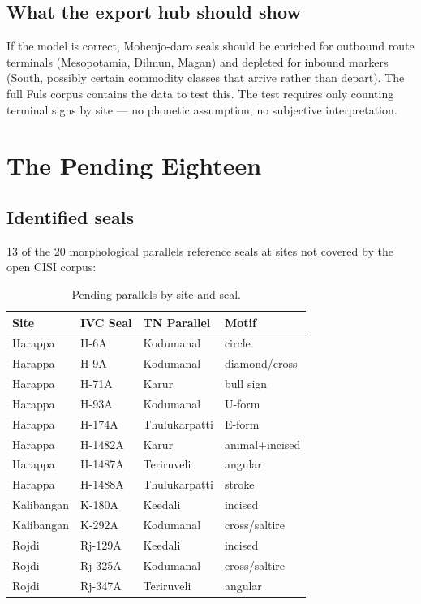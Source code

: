 \subsection{What the export hub should show}

If the model is correct, Mohenjo-daro seals should be enriched
for outbound route terminals (Mesopotamia, Dilmun, Magan) and
depleted for inbound markers (South, possibly certain commodity
classes that arrive rather than depart). The full Fuls corpus
contains the data to test this. The test requires only counting
terminal signs by site --- no phonetic assumption, no subjective
interpretation.

\section{The Pending Eighteen}

\subsection{Identified seals}

13 of the 20 morphological parallels reference seals at sites
not covered by the open CISI corpus:

\begin{longtable}{@{}llll@{}}
\caption{Pending parallels by site and seal.}
\label{tab:pending}\\
\toprule
Site & IVC Seal & TN Parallel & Motif \\
\midrule
\endfirsthead
\bottomrule
\endlastfoot
Harappa & H-6A   & Kodumanal & circle \\
\midrule
Harappa & H-9A   & Kodumanal & diamond/cross \\
\midrule
Harappa & H-71A  & Karur & bull sign \\
\midrule
Harappa & H-93A  & Kodumanal & U-form \\
\midrule
Harappa & H-174A & Thulukarpatti & E-form \\
\midrule
Harappa & H-1482A & Karur & animal+incised \\
\midrule
Harappa & H-1487A & Teriruveli & angular \\
\midrule
Harappa & H-1488A & Thulukarpatti & stroke \\
\midrule
Kalibangan & K-180A & Keedali & incised \\
\midrule
Kalibangan & K-292A & Kodumanal & cross/saltire \\
\midrule
Rojdi & Rj-129A & Keedali & incised \\
\midrule
Rojdi & Rj-325A & Kodumanal & cross/saltire \\
\midrule
Rojdi & Rj-347A & Teriruveli & angular \\
\end{longtable}

